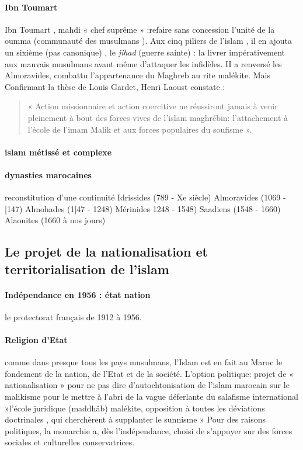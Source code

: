 \paragraph{Ibn Toumart} \label{theo:IbnToumart1}  Ibn Toumart , mahdi « chef suprême » :refaire sans concession l'unité de la oumma (communauté des musulmans ).
Aux cinq piliers de l'islam , il en ajouta un sixième (pas canonique) , le \textit{jihad} (guerre sainte) : la livrer impérativement aux mauvais musulmans avant même d'attaquer les infidèles.
 II a renversé les Almoravides, combattu l'appartenance du Maghreb au rite malékite.
 Mais Confirmant la thèse de Louis Gardet, Henri Laoust constate :\begin{quote}
     « Action missionnaire et action coercitive ne réussiront jamais à venir pleinement à bout des forces vives de l'islam maghrébin: l'attachement à l'école de l'imam Malik et aux forces populaires du soufisme ».
 \end{quote} 

\paragraph{islam métissé et complexe}


\paragraph{dynasties marocaines} reconstitution d'une continuité
 Idrissides (789 - Xe siècle)
 Almoravides (1069 - [147)
 Almohades (1|47 - 1248)
 Mérinides 1248 - 1548)
Saadiens (1548 - 1660)
  Alaouites (1660 à nos jours)

\subsection{Le projet de la nationalisation et territorialisation de l'islam}

\paragraph{Indépendance en 1956 : état nation} le protectorat français de 1912 à 1956.

\paragraph{Religion d'Etat}
   comme dans presque tous les pays musulmans, l'Islam est en fait au Maroc le fondement de la nation, de l'Etat et de la société.
 L'option politique:
projet
de « nationalisation » pour ne pas dire d'autochtonisation de l'islam marocain sur le malikisme pour le mettre à l'abri de la vague déferlante du salafisme international »l'école juridique (maddhâb) malékite, opposition à toutes les déviations doctrinales , qui cherchèrent à supplanter le sunnisme » Pour des raisons politiques, la monarchie a, dès l'indépendance, choisi de s'appuyer sur des forces sociales et culturelles conservatrices.




